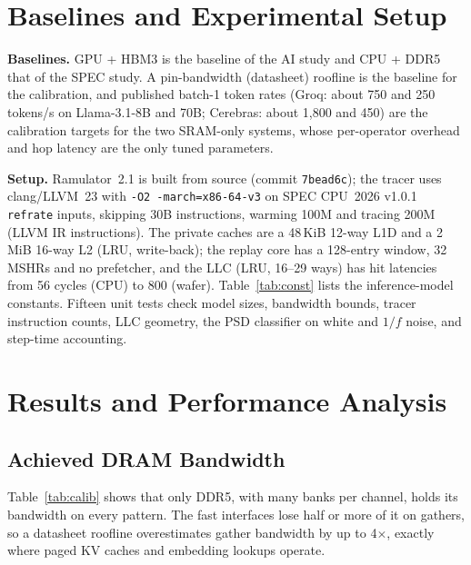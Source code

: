 \documentclass[conference]{IEEEtran}
\newcommand{\tmx}{\ensuremath{\times}}
\begin{document}
\section{Baselines and Experimental Setup}\label{sec:setup}
\textbf{Baselines.} GPU + HBM3 is the baseline of the AI study and CPU + DDR5 that of the SPEC study. A pin-bandwidth (datasheet) roofline is the baseline for the calibration, and published batch-1 token rates (Groq: about 750 and 250 tokens/s on Llama-3.1-8B and 70B; Cerebras: about 1,800 and 450) are the calibration targets for the two SRAM-only systems, whose per-operator overhead and hop latency are the only tuned parameters.

\textbf{Setup.} Ramulator~2.1 is built from source (commit \texttt{7bead6c}); the tracer uses clang/LLVM~23 with \texttt{-O2 -march=x86-64-v3} on SPEC CPU~2026 v1.0.1 \texttt{refrate} inputs, skipping 30B instructions, warming 100M and tracing 200M (LLVM IR instructions). The private caches are a 48\,KiB 12-way L1D and a 2\,MiB 16-way L2 (LRU, write-back); the replay core has a 128-entry window, 32 MSHRs and no prefetcher, and the LLC (LRU, 16--29 ways) has hit latencies from 56 cycles (CPU) to 800 (wafer). Table~\ref{tab:const} lists the inference-model constants. Fifteen unit tests check model sizes, bandwidth bounds, tracer instruction counts, LLC geometry, the PSD classifier on white and $1/f$ noise, and step-time accounting.

\section{Results and Performance Analysis}\label{sec:results}
\subsection{Achieved DRAM Bandwidth}
Table~\ref{tab:calib} shows that only DDR5, with many banks per channel, holds its bandwidth on every pattern. The fast interfaces lose half or more of it on gathers, so a datasheet roofline overestimates gather bandwidth by up to 4\tmx{}, exactly where paged KV caches and embedding lookups operate.
\end{document}
